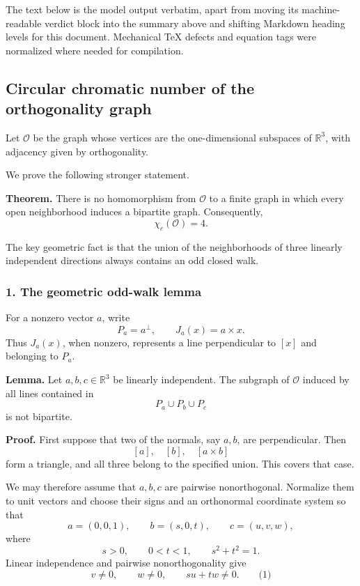 \documentclass[
  11pt,
  a4paper,
]{article}
\begin{document}
The text below is the model output verbatim, apart from moving its
machine-readable verdict block into the summary above and shifting
Markdown heading levels for this document. Mechanical TeX defects and
equation tags were normalized where needed for compilation.

\subsection{Circular chromatic number of the orthogonality
graph}\label{circular-chromatic-number-of-the-orthogonality-graph}

Let \(\mathcal O\) be the graph whose vertices are the one-dimensional
subspaces of \(\mathbb R^3\), with adjacency given by orthogonality.

We prove the following stronger statement.

\textbf{Theorem.} There is no homomorphism from \(\mathcal O\) to a
finite graph in which every open neighborhood induces a bipartite graph.
Consequently, \[
\boxed{\chi_c(\mathcal O)=4.}
\]

The key geometric fact is that the union of the neighborhoods of three
linearly independent directions always contains an odd closed walk.

\subsubsection{1. The geometric odd-walk
lemma}\label{the-geometric-odd-walk-lemma}

For a nonzero vector \(a\), write \[
P_a=a^\perp,\qquad J_a(x)=a\times x.
\] Thus \(J_a(x)\), when nonzero, represents a line perpendicular to
\([x]\) and belonging to \(P_a\).

\textbf{Lemma.} Let \(a,b,c\in\mathbb R^3\) be linearly independent. The
subgraph of \(\mathcal O\) induced by all lines contained in \[
P_a\cup P_b\cup P_c
\] is not bipartite.

\textbf{Proof.} First suppose that two of the normals, say \(a,b\), are
perpendicular. Then \[
[a],\quad [b],\quad [a\times b]
\] form a triangle, and all three belong to the specified union. This
covers that case.

We may therefore assume that \(a,b,c\) are pairwise nonorthogonal.
Normalize them to unit vectors and choose their signs and an orthonormal
coordinate system so that \[
a=(0,0,1),\qquad b=(s,0,t),\qquad c=(u,v,w),
\] where \[
s>0,\qquad 0<t<1,\qquad s^2+t^2=1.
\] Linear independence and pairwise nonorthogonality give \[
v\ne0,\qquad w\ne0,\qquad su+tw\ne0. \qquad\text{(1)}
\]
\end{document}
